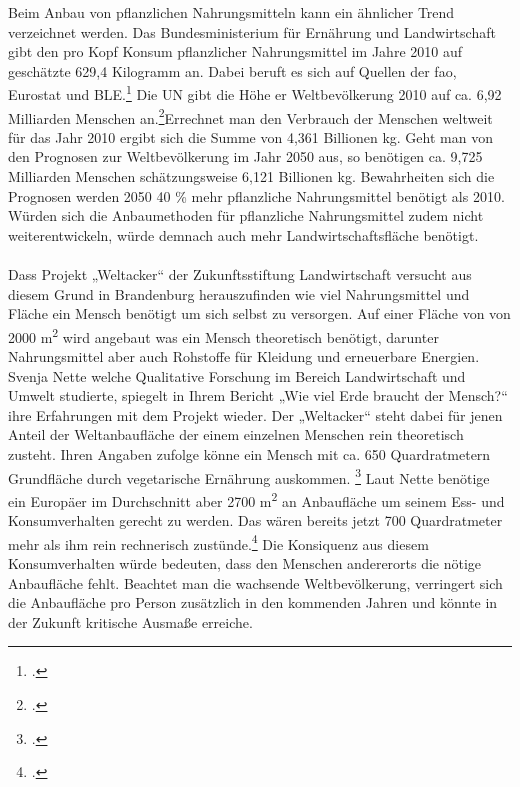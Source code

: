 \documentclass{scrartcl}
\begin{document}
Beim Anbau von pflanzlichen Nahrungsmitteln kann ein ähnlicher Trend verzeichnet werden. Das Bundesministerium für Ernährung und Landwirtschaft gibt den pro Kopf Konsum pflanzlicher Nahrungsmittel im Jahre 2010 auf geschätzte 629,4 Kilogramm an. Dabei beruft es sich auf Quellen der \acs{fao}, Eurostat und BLE.\footcite[Vgl.][S. 1]{BundesministeriumfurErnahrungundLandwirtschaft2005DurchschnittlicherKopf} Die UN gibt die Höhe er Weltbevölkerung 2010 auf ca. 6,92 Milliarden Menschen an.\footcite[Vgl.][S. 3]{UnitedNationsDepartmentofEconomicandSocialAffairs2017World2017}Errechnet man den Verbrauch der Menschen weltweit für das Jahr 2010 ergibt sich die Summe von 4,361 Billionen kg. Geht man von den Prognosen zur Weltbevölkerung im Jahr 2050 aus, so benötigen ca. 9,725 Milliarden Menschen schätzungsweise 6,121 Billionen kg. Bewahrheiten sich die Prognosen werden 2050 40 \% mehr pflanzliche Nahrungsmittel benötigt als 2010. Würden sich die Anbaumethoden für pflanzliche Nahrungsmittel zudem nicht weiterentwickeln, würde demnach auch mehr Landwirtschaftsfläche benötigt.\\
\\
Dass Projekt „Weltacker“ der Zukunftsstiftung Landwirtschaft versucht aus diesem Grund in Brandenburg herauszufinden wie viel Nahrungsmittel und Fläche ein Mensch benötigt um sich selbst zu versorgen. Auf einer Fläche von von 2000 m\textsuperscript{2} wird angebaut was ein Mensch theoretisch benötigt, darunter Nahrungsmittel aber auch Rohstoffe für Kleidung und erneuerbare Energien. Svenja Nette welche Qualitative Forschung im Bereich Landwirtschaft und Umwelt studierte, spiegelt in Ihrem Bericht „Wie viel Erde braucht der Mensch?“ ihre Erfahrungen mit dem Projekt wieder. Der „Weltacker“ steht dabei für jenen Anteil der Weltanbaufläche der einem einzelnen Menschen rein theoretisch zusteht. Ihren Angaben zufolge könne ein Mensch mit ca. 650 Quardratmetern Grundfläche durch vegetarische Ernährung auskommen. \footcite[Vgl.]{Nette2014WievielMensch}
Laut Nette benötige ein Europäer im Durchschnitt aber 2700 m\textsuperscript{2} an Anbaufläche um seinem Ess- und Konsumverhalten gerecht zu werden. Das wären bereits jetzt 700 Quardratmeter mehr als ihm rein rechnerisch zustünde.\footcite[Vgl.]{Nette2014WievielMensch} Die Konsiquenz aus diesem Konsumverhalten würde bedeuten, dass den Menschen andererorts die nötige Anbaufläche fehlt. Beachtet man die wachsende Weltbevölkerung, verringert sich die Anbaufläche pro Person zusätzlich in den kommenden Jahren und könnte in der Zukunft kritische Ausmaße erreiche.\\
\end{document}
